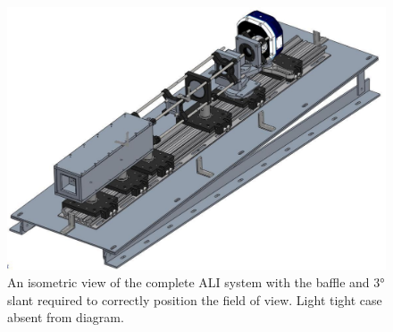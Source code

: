 \documentclass[12pt]{article}
\begin{document}
\begin{figure}
        \centering
        \includegraphics[width=1.0\textwidth]{./Images/3-3-AliCompleteDesign.pdf}
        \caption{An isometric view of the complete ALI system with the baffle and 3\si{\degree} slant required to correctly position the field of view. Light tight case absent 
from diagram.}
        \label{fig:3.3:aliSystemDiagram}
\end{figure}

\clearpage
\end{document}
